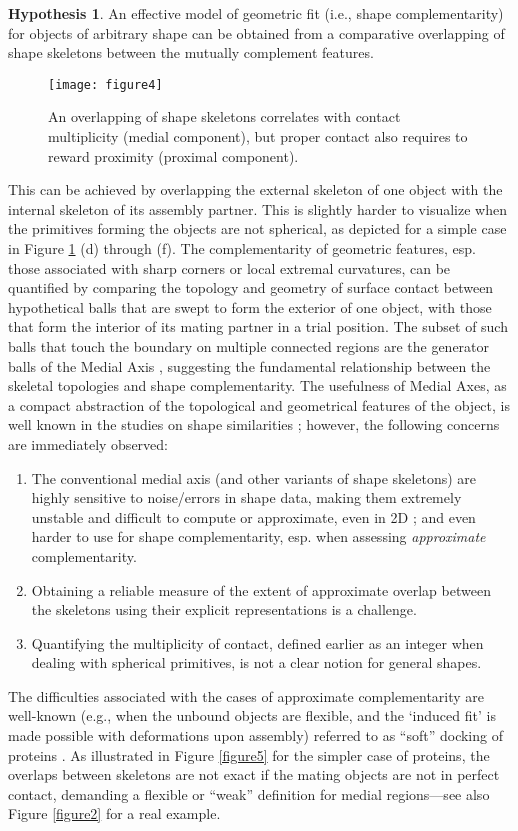 \documentclass[article]{gmp2014}
\theoremstyle{definition}
\newtheorem{hypo}{\textsf{\textbf{{Hypothesis}}}}
\begin{document}
\begin{hypo}
An effective model of geometric fit {\rm (i.e., shape complementarity)} for objects of arbitrary shape can be obtained from a comparative overlapping of shape skeletons between the mutually complement features.
\end{hypo}

%
\begin{figure}
    \centering
    \texttt{[image: figure4]}
    \caption{An overlapping of shape skeletons correlates with contact multiplicity (medial component), but proper contact also requires to reward proximity (proximal component).} \label{figure4}
\end{figure}
%

This can be achieved by overlapping the external skeleton of one object with the internal skeleton of its assembly partner. This is slightly harder to visualize when the primitives forming the objects are not spherical, as depicted for a simple case in Figure \ref{figure4} (d) through (f). The complementarity of geometric features, esp. those associated with sharp corners or local extremal curvatures, can be quantified by comparing the topology and geometry of surface contact between hypothetical balls that are swept to form the exterior of one object, with those that form the interior of its mating partner in a trial position. The subset of such balls that touch the boundary on multiple connected regions are the generator balls of the Medial Axis \cite{Choi1997}, suggesting the fundamental relationship between the skeletal topologies and shape complementarity. The usefulness of Medial Axes, as a compact abstraction of the topological and geometrical features of the object, is well known in the studies on shape similarities \cite{Tangelder2004, Torsello2004}; however, the following concerns are immediately observed:
%
\begin{enumerate}
    \item The conventional medial axis (and other variants of shape skeletons) are highly sensitive to noise/errors in shape data, making them extremely unstable and difficult to compute or approximate, even in 2D \cite{Lee1982, Attali2009}; and even harder to use for shape complementarity, esp. when assessing {\it approximate} complementarity.
    \item Obtaining a reliable measure of the extent of approximate overlap between the skeletons using their explicit representations is a challenge.
    \item Quantifying the multiplicity of contact, defined earlier as an integer when dealing with spherical primitives, is not a clear notion for general shapes.
\end{enumerate}
%
The difficulties associated with the cases of approximate complementarity are well-known (e.g., when the unbound objects are flexible, and the `induced fit' is made possible with deformations upon assembly) referred to as ``soft'' docking of proteins \cite{Jiang1991}. As illustrated in Figure \ref{figure5} for the simpler case of proteins, the overlaps between skeletons are not exact if the mating objects are not in perfect contact, demanding a flexible or ``weak'' definition for medial regions---see also Figure \ref{figure2} for a real example.
\end{document}

